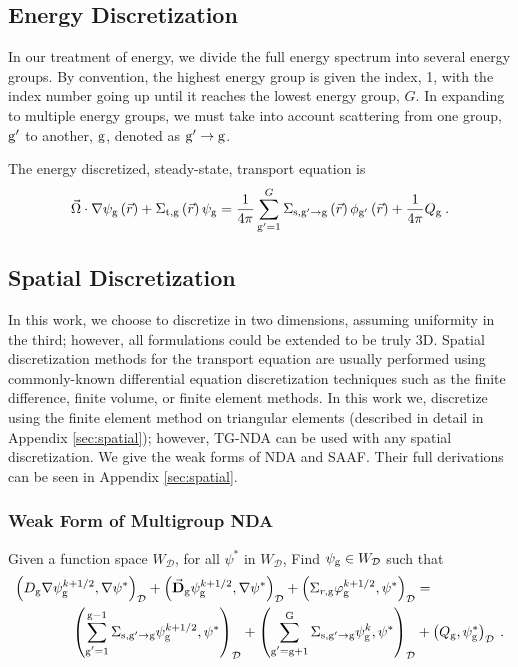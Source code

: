 \subsection{Energy Discretization}
In our treatment of energy, we divide the full energy spectrum into several energy groups. By convention, the highest energy group is given the index, 1, with the index number going up until it reaches the lowest energy group, $G$. In expanding to multiple energy groups, we must take into account scattering from one group, $\mathrm{g}'$ to another, $\mathrm{g}$, denoted as $\mathrm{g}' \rightarrow \mathrm{g} $. 

The energy discretized, steady-state, transport equation is
%
 \begin{equation}
  \vec{\Omega} \cdot \nabla \psi_{\mathrm{g}} \left(\vec{r}\right)+ \Sigma_{\mathrm{t}, \mathrm{g}}\left(\vec{r}\right)\psi_{\mathrm{g}} = \frac{1}{4 \pi} \sum\limits_{\mathrm{g}'=1}^{G}\Sigma_{\mathrm{s}, \mathrm{g}' \rightarrow \mathrm{g}}\left(\vec{r}\right) \phi_{\mathrm{g}'}\left(\vec{r}\right) + \frac{1}{4 \pi} Q_{\mathrm{g}}\:.
  \label{eq:transport-energy}
 \end{equation}


\subsection{Spatial Discretization}
In this work, we choose to discretize in two dimensions, assuming uniformity in the third; however, all formulations could be extended to be truly 3D. Spatial discretization methods for the transport equation are usually performed using commonly-known differential equation discretization techniques such as the finite difference, finite volume, or finite element methods. In this work we, discretize using the finite element method on triangular elements (described in detail in Appendix \ref{sec:spatial}); however, TG-NDA can be used with any spatial discretization. We give the weak forms of NDA and SAAF. Their full derivations can be seen in Appendix \ref{sec:spatial}. 


\subsubsection{Weak Form of Multigroup NDA}

Given a function space $W_\mathcal{D}$, for all $\psi^*$ in $W_\mathcal{D}$, Find $\psi_{\mathrm{g}} \in W_\mathcal{D}$ such that
%
\begin{equation}
 \begin{split}
  \left(D_{\mathrm{g}} \nabla \psi_{\mathrm{g}}^{k+1/2}, \nabla \psi^*\right)_\mathcal{D} + \left(\vec{\bf{D}}_{\mathrm{g}} \psi_{\mathrm{g}}^{k+1/2} , \nabla \psi^*\right)_\mathcal{D} +  \left(\Sigma_{r,\mathrm{g}} \varphi_{\mathrm{g}}^{k+1/2}, \psi^*\right)_\mathcal{D} &=  \\
   \left(\sum\limits_{\substack{\mathrm{g}'=1}}^{\mathrm{g-1}} \Sigma_{\mathrm{s},\mathrm{g}' \to\mathrm{g}}\psi_{\mathrm{g}}^{k+1/2}, \psi^*\right)_\mathcal{D} + \left(\sum\limits_{\substack{\mathrm{g}'=\mathrm{g}+1}}^{\mathrm{G}} \Sigma_{\mathrm{s},\mathrm{g}' \to\mathrm{g}}\psi_{\mathrm{g}}^{k}, \psi^*\right)_\mathcal{D} 
  &+ \left(Q_{\mathrm{g}}, \psi^*_{\mathrm{g}}\right)_\mathcal{D} \:.
 \end{split}
 \label{k1/2}
\end{equation}

